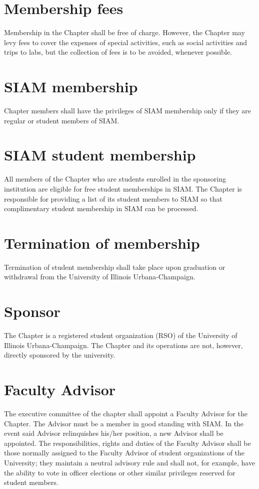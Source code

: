 \documentclass{ronr-bylaws}
\begin{document}
\section{Membership fees}
Membership in the Chapter shall be free of charge. However, the Chapter may levy fees to cover the
expenses of special activities, such as social activities and trips to labs, but the collection of
fees is to be avoided, whenever possible.

\section{SIAM membership}
Chapter members shall have the privileges of SIAM membership only if they are regular or student
members of SIAM.

\section{SIAM student membership}
All members of the Chapter who are students enrolled in the sponsoring institution are eligible for
free student memberships in SIAM. The Chapter is responsible for providing a list of its student
members to SIAM so that complimentary student membership in SIAM can be processed.

\section{Termination of membership}
Termination of student membership shall take place upon graduation or withdrawal from the University
of Illinois Urbana-Champaign.

\section{Sponsor}
The Chapter is a registered student organization (RSO) of the University of Illinois
Urbana-Champaign.  The Chapter and its operations are not, however, directly sponsored by the
university.

\section{Faculty Advisor}
The executive committee of the chapter shall appoint a Faculty Advisor for the Chapter.  The Advisor
must be a member in good standing with SIAM. In the event said Advisor relinquishes his/her
position, a new Advisor shall be appointed.  The responsibilities, rights and duties of the Faculty
Advisor shall be those normally assigned to the Faculty Advisor of student organizations of the
University; they maintain a neutral advisory rule and shall not, for example, have the ability to
vote in officer elections or other similar privileges reserved for student members.
\end{document}
